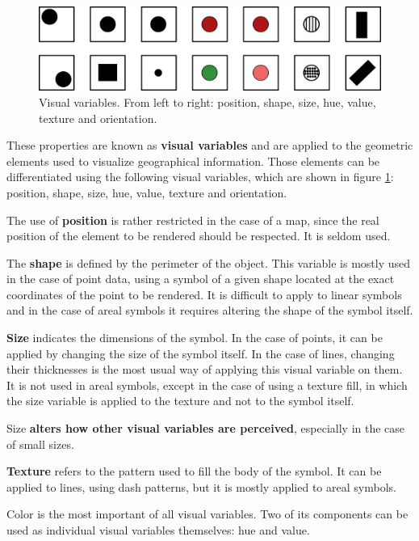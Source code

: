 \begin{figure}[!hbt]
\centering
\includegraphics[width=\columnwidth]{Visualization/VisualVariables.pdf}
\caption{\small Visual variables. From left to right: position, shape, size, hue, value, texture and orientation.}
\label{Fig:VisualVariables} 
\end{figure}

These properties are known as \textbf{visual variables} and are applied to the geometric elements used to visualize geographical information. Those elements can be differentiated using the following visual variables, which are shown in figure \ref{Fig:VisualVariables}: position, shape, size, hue, value, texture and orientation.

The use of \textbf{position} is rather restricted in the case of a map, since the real position of the element to be rendered should be respected. It is seldom used. 

The \textbf{shape} is defined by the perimeter of the object. This variable is mostly used in the case of point data, using a symbol of a given shape located at the exact coordinates of the point to be rendered. It is difficult to apply to linear symbols and in the case of areal symbols it requires altering the shape of the symbol itself.

\textbf{Size} indicates the dimensions of the symbol. In the case of points, it can be applied by changing the size of the symbol itself. In the case of lines, changing their thicknesses is the most usual way of applying this visual variable on them. It is not used in areal symbols, except in the case of using a texture fill, in which the size variable is applied to the texture and not to the symbol itself.

Size \textbf{alters how other visual variables are perceived}, especially in the case of small sizes.

\textbf{Texture} refers to the pattern used to fill the body of the symbol. It can be applied to lines, using dash patterns, but it is mostly applied to areal symbols.

Color is the most important of all visual variables. Two of its components can be used as individual visual variables themselves: hue and value.

